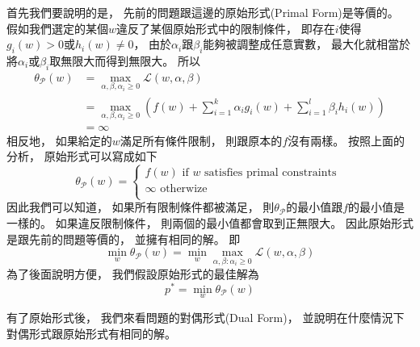  首先我們要說明的是，
  先前的問題跟這邊的原始形式(Primal Form)是等價的。
  假如我們選定的某個$w$違反了某個原始形式中的限制條件，
  即存在$i$使得$g_i(w) > 0$或$h_i(w) \neq 0$，
  由於$\alpha_i$跟$\beta_i$能夠被調整成任意實數，
  最大化就相當於將$\alpha_i$或$\beta_i$取無限大而得到無限大。
  所以
  \begin{equation}
    \begin{split}
      \theta_{\mathcal{P}}(w) 
      & = \max_{\alpha, \beta, \alpha_i \geq 0} \mathcal{L}(w, \alpha, \beta) \\
      & = \max_{\alpha, \beta, \alpha_i \geq 0} \left( f(w) + \sum_{i=1}^k \alpha_i g_i(w) + \sum_{i=1}^l \beta_i h_i(w) \right) \\
      & = \infty
    \end{split}
  \end{equation}    
  相反地，
  如果給定的$w$滿足所有條件限制，
  則跟原本的$f$沒有兩樣。
  按照上面的分析，
  原始形式可以寫成如下
  \begin{equation}
    \theta_{\mathcal{P}}(w) =
    \left\{ 
      \begin{array}{l}
	f(w) \text{ if } w \text{ satisfies primal constraints } \\
	\infty \text{ otherwize } \\
      \end{array}
    \right.	
  \end{equation}
  因此我們可以知道，
  如果所有限制條件都被滿足，
  則$\theta_{\mathcal{P}}$的最小值跟$f$的最小值是一樣的。
  如果違反限制條件，
  則兩個的最小值都會取到正無限大。    
  因此原始形式是跟先前的問題等價的，
  並擁有相同的解。
  即
  \begin{equation}
    \min_w \theta_{\mathcal{P}}(w) = \min_w \max_{\alpha, \beta: \alpha_i \geq 0} \mathcal{L}(w, \alpha, \beta)    
  \end{equation}
  為了後面說明方便，
  我們假設原始形式的最佳解為
  \begin{equation}
    p^{*} = \min_w \theta_{\mathcal{P}}(w)
  \end{equation}    

  有了原始形式後，
  我們來看問題的對偶形式(Dual Form)，
  並說明在什麼情況下對偶形式跟原始形式有相同的解。

